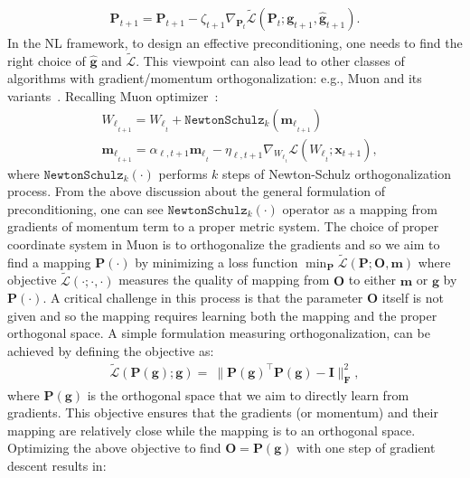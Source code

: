 \documentclass{article}
\newcommand{\citep}{\parencite}
\newcommand{\vg}{\boldsymbol{g}}
\newcommand{\vm}{\boldsymbol{m}}
\newcommand{\vo}{\boldsymbol{O}}
\newcommand{\vp}{\boldsymbol{P}}
\begin{document}
\begin{align}
    \boldsymbol{P}_{t+1} = \boldsymbol{P}_{t+1} - \zeta_{t+1} \nabla_{\boldsymbol{P}_{t}} \tilde{\mathcal{L}} \left(\boldsymbol{P}_{t}; {\boldsymbol{g}}_{t+1} , \hat{\boldsymbol{g}}_{t+1}  \right).
\end{align}
In the NL framework, to design an effective preconditioning, one needs to find the right choice of  $\hat{\boldsymbol{g}}$ and  $\tilde{\mathcal{L}}.$
This viewpoint  can also lead to other classes of algorithms with gradient/momentum orthogonalization: e.g., Muon and its variants~\citep{jordanmuon, cesista2025spectralclipping, ManifoldMuon2025Keigwin}. Recalling Muon optimizer~\citep{jordanmuon}:
\begin{align}\nonumber
    &{W_{\ell}}_{_{t+1}} = {W_{\ell}}_{_{t}} + \texttt{NewtonSchulz}_k\left({\boldsymbol{m}_{\ell}}_{_{t+1}}\right)\\ \label{eq:muon1}
    &{\boldsymbol{m}_{\ell}}_{_{t+1}} = \alpha_{\ell, t+1} {\boldsymbol{m}_{\ell}}_{_{t}} - \eta_{\ell, t+1} \nabla_{{W_{\ell}}_{_{t}}} \mathcal{L}\left({W_{\ell}}_{_{t}}; \boldsymbol{x}_{t+1}\right),
\end{align}
where $\texttt{NewtonSchulz}_k(\cdot)$ performs $k$ steps of Newton-Schulz orthogonalization process. From the above discussion about the general formulation of preconditioning, one can see $\texttt{NewtonSchulz}_k(\cdot)$ operator as a mapping from gradients of momentum term to a proper metric system. The choice of proper coordinate system in Muon is to orthogonalize the gradients and so we aim to find a mapping $\boldsymbol{P}\left(\cdot \right)$ by minimizing a loss function $\min_{\boldsymbol{P}}\tilde{\mathcal{L}} (\boldsymbol{P}; \boldsymbol{O}, \vm)$
where objective $\tilde{\mathcal{L}}(\cdot; \cdot, \cdot)$ measures the quality of mapping from $\vo$ to either $\vm$ or $\vg$ by $\vp(\cdot)$. A critical challenge in this process is that the parameter $\vo$ itself is not given and so the mapping requires learning both the mapping and the proper orthogonal space. A simple formulation measuring orthogonalization, can be achieved by defining the objective as:
\begin{align}\label{eq:muon-motivation}
    \tilde{\mathcal{L}}(\vp(\vg); \vg) =  \: \| \vp(\vg)^{\top} \vp(\vg) - \boldsymbol{I} \|^2_{\boldsymbol{F}}, 
\end{align}
where $\vp(\vg)$ is the orthogonal space that we aim to directly learn from gradients. This objective ensures that the gradients (or momentum) and their mapping are relatively close while the mapping is to an orthogonal space.   Optimizing the above objective to find $\vo = \vp(\vg)$ with one step of gradient descent results in: 
\end{document}
